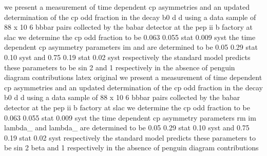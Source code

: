 we present a measurement of time dependent cp asymmetries and an updated determination of the cp odd fraction in the decay b0 d d using a data sample of 88 x 10 6 bbbar pairs collected by the babar detector at the pep ii b factory at slac we determine the cp odd fraction to be 0.063 0.055 stat 0.009 syst the time dependent cp asymmetry parameters im  and  are determined to be 0.05 0.29 stat 0.10 syst and 0.75 0.19 stat 0.02 syst respectively the standard model predicts these parameters to be sin 2 and 1 respectively in the absence of penguin diagram contributions latex original we present a measurement of time dependent cp asymmetries and an updated determination of the cp odd fraction in the decay b0 d d using a data sample of 88 x 10 6 bbbar pairs collected by the babar detector at the pep ii b factory at slac we determine the cp odd fraction to be 0.063 0.055 stat 0.009 syst the time dependent cp asymmetry parameters rm im lambda_ and lambda_ are determined to be 0.05 0.29 stat 0.10 syst and 0.75 0.19 stat 0.02 syst respectively the standard model predicts these parameters to be sin 2 beta and 1 respectively in the absence of penguin diagram contributions
